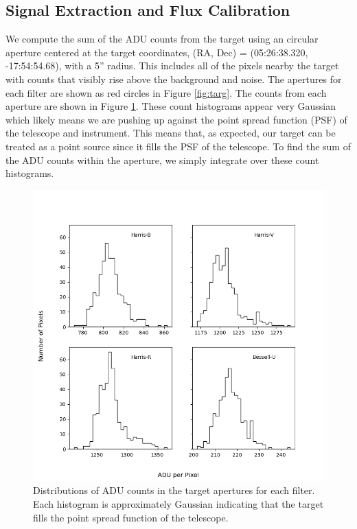 \documentclass{aastex631}
\begin{document}
\subsection{Signal Extraction and Flux Calibration}
We compute the sum of the ADU counts from the target using an circular aperture centered at the target coordinates, (RA, Dec) = (05:26:38.320, -17:54:54.68), with a 5'' radius. This includes all of the pixels nearby the target with counts that visibly rise above the background and noise. The apertures for each filter are shown as red circles in Figure \ref{fig:targ}. The counts from each aperture are shown in Figure \ref{fig:aperture-counts}. These count histograms appear very Gaussian which likely means we are pushing up against the point spread function (PSF) of the telescope and instrument. This means that, as expected, our target can be treated as a point source since it fills the PSF of the telescope. To find the sum of the ADU counts within the aperture, we simply integrate over these count histograms. 

\begin{figure}
  \includegraphics[width=\textwidth]{../analysis/aperture-counts-hist.png}
  \caption{Distributions of ADU counts in the target apertures for each filter. Each histogram is approximately Gaussian indicating that the target fills the point spread function of the telescope.}
  \label{fig:aperture-counts}
\end{figure}
\end{document}
